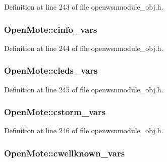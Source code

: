 Definition at line 243 of file openwsnmodule\+\_\+obj.\+h.

\subsubsection[{\texorpdfstring{cinfo\+\_\+vars}{cinfo_vars}}]{ Open\+Mote\+::cinfo\+\_\+vars}\hypertarget{struct_open_mote_a8a59e70923fa709385930eab33599db4}{}\label{struct_open_mote_a8a59e70923fa709385930eab33599db4}


Definition at line 244 of file openwsnmodule\+\_\+obj.\+h.

\subsubsection[{\texorpdfstring{cleds\+\_\+vars}{cleds_vars}}]{ Open\+Mote\+::cleds\+\_\+vars}\hypertarget{struct_open_mote_af6231c89f1008084144bf1fe1706a016}{}\label{struct_open_mote_af6231c89f1008084144bf1fe1706a016}


Definition at line 245 of file openwsnmodule\+\_\+obj.\+h.

\subsubsection[{\texorpdfstring{cstorm\+\_\+vars}{cstorm_vars}}]{ Open\+Mote\+::cstorm\+\_\+vars}\hypertarget{struct_open_mote_a13239242a3bd108d2c5f5152f7cf5a66}{}\label{struct_open_mote_a13239242a3bd108d2c5f5152f7cf5a66}


Definition at line 246 of file openwsnmodule\+\_\+obj.\+h.

\subsubsection[{\texorpdfstring{cwellknown\+\_\+vars}{cwellknown_vars}}]{ Open\+Mote\+::cwellknown\+\_\+vars}\hypertarget{struct_open_mote_a0b1c0999849a0f4f6667f7b736e4d2fa}{}\label{struct_open_mote_a0b1c0999849a0f4f6667f7b736e4d2fa}


